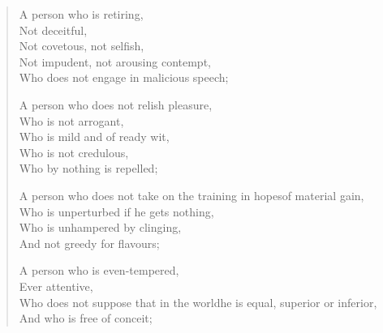 \begin{verse}

 A person who is retiring,\\
Not deceitful,\\
Not covetous, not selfish,\\
Not impudent, not arousing contempt,\\
Who does not engage in malicious speech;


 A person who does not relish pleasure,\\
Who is not arrogant,\\
Who is mild and of ready wit,\\
Who is not credulous,\\
Who by nothing is repelled;


 A person who does not take on the training in hopes\newline of material gain,\\
Who is unperturbed if he gets nothing,\\
Who is unhampered by clinging,\\
And not greedy for flavours;


 A person who is even-tempered,\\
Ever attentive,\\
Who does not suppose that in the world\newline he is equal, superior or inferior,\\
And who is free of conceit;



\end{verse}
